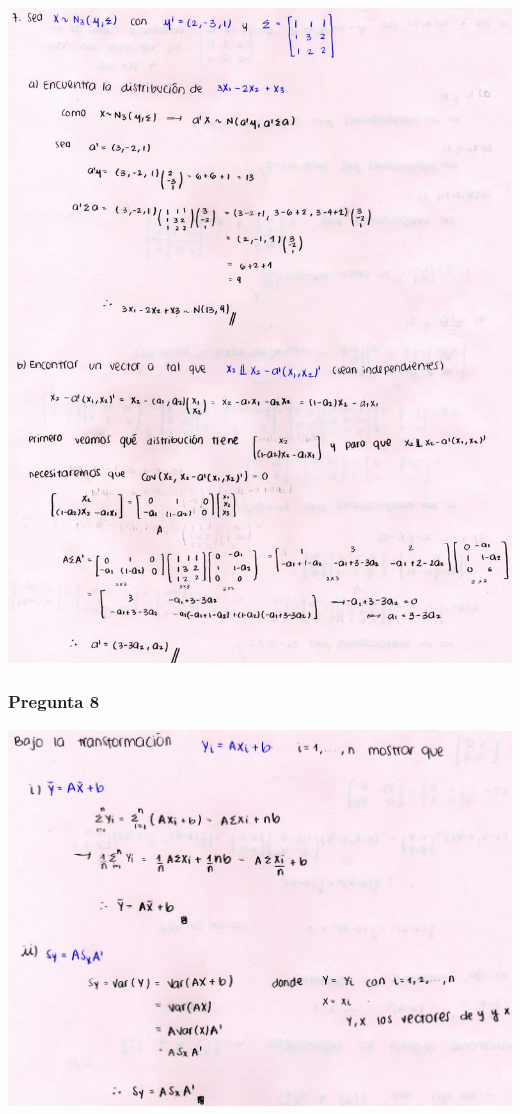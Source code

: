 \documentclass[
]{article}
\begin{document}
\includegraphics{7.jpg}

\hypertarget{pregunta-8}{%
\subsubsection{\texorpdfstring{\textbf{Pregunta
8}}{Pregunta 8}}\label{pregunta-8}}

\includegraphics{8.jpg}
\end{document}
